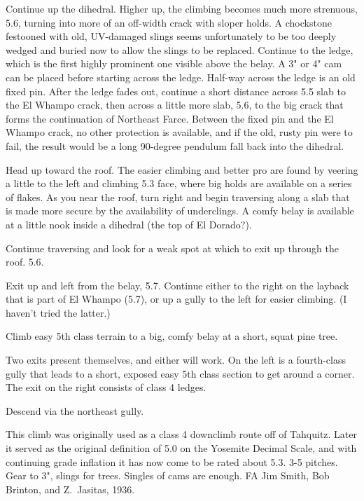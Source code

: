 \documentclass{tahquitz}
\begin{document}
 Continue up the dihedral.
Higher up, the climbing becomes much more strenuous, 5.6, turning
into more of an off-width crack with sloper holds. A chockstone festooned with
old, UV-damaged slings seems unfortunately to be too deeply wedged and buried
now to allow the slings to be replaced. Continue to the ledge, which is the first
highly prominent one visible above the belay. A 3" or 4" cam can be placed before
starting across the ledge. Half-way across the ledge is an old fixed pin. After the
ledge fades out, continue a short distance across 5.5 slab to the El Whampo crack,
then across a little more slab, 5.6, to the big crack that forms the continuation
of Northeast Farce.
Between the fixed pin and the El Whampo crack, no other protection is available,
and if the old, rusty pin were to fail, the result would be a long 90-degree pendulum
fall back into the dihedral.

 Head up toward the roof. The easier climbing and better pro are found
by veering a little to the left and climbing 5.3 face, where big holds are available on a series of flakes.
As you near the roof, turn right and begin traversing
along a slab that is made more secure by the availability of underclings. A comfy
belay is available at a little nook inside a dihedral (the top of El Dorado?).

 Continue traversing and look for a weak spot at which to exit up through the roof. 5.6.

 Exit up and left from the belay, 5.7. Continue either to the right on the layback
that is part of El Whampo (5.7), or up a gully to the left for easier climbing. (I haven't tried
the latter.)

 Climb easy 5th class terrain to a big, comfy belay at a short, squat pine tree.

 Two exits present themselves, and either will work. On the left is a fourth-class
gully that leads to a short, exposed easy 5th class section to get around a corner.
The exit on the right consists of class 4 ledges.

Descend via the northeast gully.




This climb was originally used as a class 4 downclimb route off of Tahquitz.
Later it served as the original definition of 5.0 on the Yosemite Decimal
Scale, and with continuing grade inflation it has now come to be
rated about 5.3. 3-5 pitches. Gear to 3",
slings for trees. Singles of cams are enough.
FA Jim Smith, Bob Brinton, and Z.~Jasitas, 1936.
\end{document}
